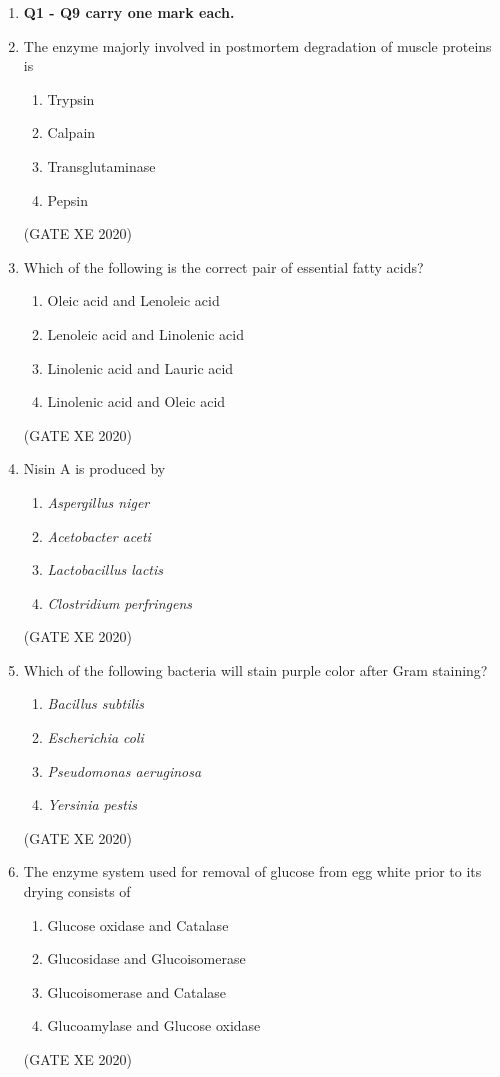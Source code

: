 \documentclass[12pt]{article}
\begin{document}
\begin{enumerate}

\item[] \textbf{Q1 - Q9 carry one mark each.}
\item The enzyme majorly involved in postmortem degradation of muscle proteins is
\begin{enumerate}
\item Trypsin
\item Calpain
\item Transglutaminase
\item Pepsin
\end{enumerate}
(GATE XE 2020)

\item Which of the following is the correct pair of essential fatty acids?
\begin{enumerate}
\item Oleic acid and Lenoleic acid
\item Lenoleic acid and Linolenic acid
\item Linolenic acid and Lauric acid
\item Linolenic acid and Oleic acid
\end{enumerate}
(GATE XE 2020)

\item Nisin A is produced by
\begin{enumerate}
\item \textit{Aspergillus niger}
\item \textit{Acetobacter aceti}
\item \textit{Lactobacillus lactis}
\item \textit{Clostridium perfringens}
\end{enumerate}
(GATE XE 2020)

\item Which of the following bacteria will stain purple color after Gram staining?
\begin{enumerate}
\item \textit{Bacillus subtilis}
\item \textit{Escherichia coli}
\item \textit{Pseudomonas aeruginosa}
\item \textit{Yersinia pestis}
\end{enumerate}
(GATE XE 2020)

\item The enzyme system used for removal of glucose from egg white prior to its drying consists of
\begin{enumerate}
\item Glucose oxidase and Catalase
\item Glucosidase and Glucoisomerase
\item Glucoisomerase and Catalase
\item Glucoamylase and Glucose oxidase
\end{enumerate}
(GATE XE 2020)


\end{enumerate}
\end{document}

